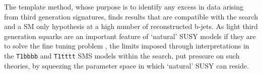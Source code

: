 The template method, whose purpose is to identify any excess in data arising from third generation signatures, finds results that are compatible with the \alphat search and a \ac{SM} only hypothesis at a high number of reconstructed b-jets. As light third generation squarks are an important feature of `natural' \ac{SUSY} models if they are to solve the fine tuning problem \cite{Hardy:2013ywa}, the limits imposed through interpretations in the \texttt{T1bbbb} and \texttt{T1tttt} \ac{SMS} models within the \alphat search, put pressure on such theories, by squeezing the parameter space in which `natural' \ac{SUSY} can reside. 

